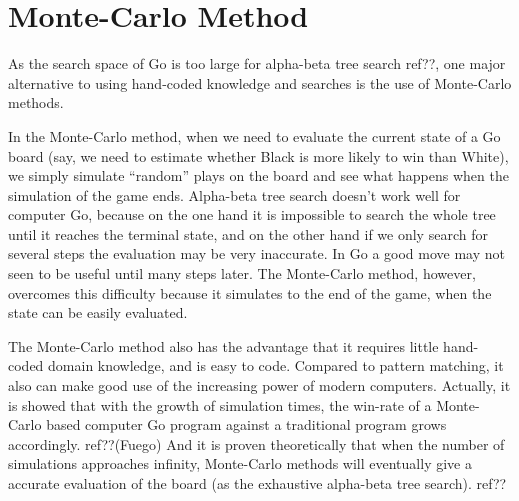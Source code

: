 

\section{Monte-Carlo Method}
As the search space of Go is too large for alpha-beta tree search ref??, one major alternative to using hand-coded knowledge and searches is the use of Monte-Carlo methods.

In the Monte-Carlo method, when we need to evaluate the current state of a Go board (say, we need to estimate whether Black is more likely to win than White), we simply simulate ``random'' plays on the board and see what happens when the simulation of the game ends. Alpha-beta tree search doesn't work well for computer Go, because on the one hand it is impossible to search the whole tree until it reaches the terminal state, and on the other hand if we only search for several steps the evaluation may be very inaccurate. In Go a good move may not seen to be useful until many steps later. The Monte-Carlo method, however, overcomes this difficulty because it simulates to the end of the game, when the state can be easily evaluated.

The Monte-Carlo method also has the advantage that it requires little hand-coded domain knowledge, and is easy to code. Compared to pattern matching, it also can make good use of the increasing power of modern computers. Actually, it is showed that with the growth of simulation times, the win-rate of a Monte-Carlo based computer Go program against a traditional program grows accordingly. ref??(Fuego) And it is proven theoretically that when the number of simulations approaches infinity, Monte-Carlo methods will eventually give a accurate evaluation of the board (as the exhaustive alpha-beta tree search). ref??

